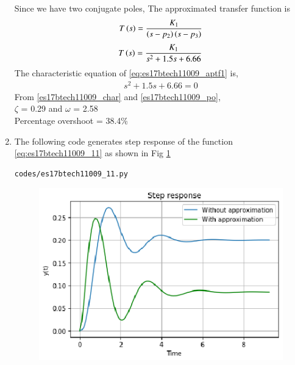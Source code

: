 \begin{enumerate}[label=\thesection.\arabic*.,ref=\thesection.\theenumi]
\begin{table}[!ht]
\centering

\caption{}
\label{table:es17btech11009_t1}
\end{table}
Since we have two conjugate poles, The approximated transfer function is
\begin{align}
T\left(s\right) = \frac{K_1}{\left(s-p_{2}\right)\left(s-p_{3}\right)}
\end{align}
\begin{align}
    T\brak{s}= \frac{K_{1}}{s^2 + 1.5s + 6.66}
    \label{eq:es17btech11009_aptf1}
\end{align}
The characteristic equation of \eqref{eq:es17btech11009_aptf1} is,
\begin{align}
 s^2 + 1.5s + 6.66 = 0
 \end{align}
From \eqref{es17btech11009_char} and \eqref{es17btech11009_po},
\\
 $\zeta$ = 0.29 and $\omega$ = 2.58
 \\
 Percentage overshoot = 38.4\%
 \item
The following code generates step response of the function \eqref{eq:es17btech11009_11} as shown in Fig \ref{fig:es17btech11009_fig11}
\begin{lstlisting}
codes/es17btech11009_11.py
\end{lstlisting}
\begin{figure}[!h]
\centering
\includegraphics[width=\columnwidth]{./figs/es17btech11009_11.eps}
\caption{}
\label{fig:es17btech11009_fig11}
\end{figure}


\end{enumerate}

